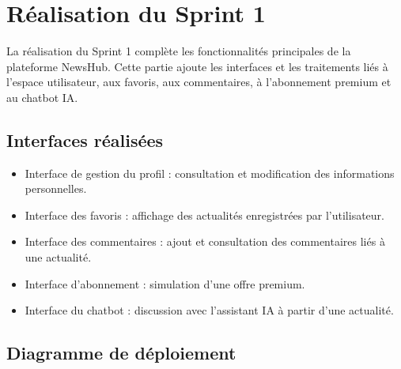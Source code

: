 \documentclass[12pt,a4paper]{report}
\begin{document}


\chapter*{Réalisation du Sprint 1}
La réalisation du Sprint 1 complète les fonctionnalités principales de la plateforme NewsHub. Cette partie ajoute les interfaces et les traitements liés à l'espace utilisateur, aux favoris, aux commentaires, à l'abonnement premium et au chatbot IA.

\section*{Interfaces réalisées}
\begin{itemize}
\item Interface de gestion du profil : consultation et modification des informations personnelles.
\item Interface des favoris : affichage des actualités enregistrées par l'utilisateur.
\item Interface des commentaires : ajout et consultation des commentaires liés à une actualité.
\item Interface d'abonnement : simulation d'une offre premium.
\item Interface du chatbot : discussion avec l'assistant IA à partir d'une actualité.
\end{itemize}

\section*{Diagramme de déploiement}
\begin{center}
\end{center}
\end{document}
